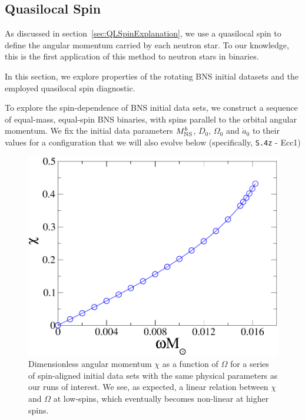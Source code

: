 \subsection{Quasilocal Spin}
\label{sec:QLSpinProperties}

As discussed in section~\ref{sec:QLSpinExplanation}, we use a
quasilocal spin to define the angular momentum carried by each
neutron star. To our knowledge, this is the first application of this
method to neutron stars in binaries. 

In this section, we explore properties of the rotating BNS initial
datasets and the employed quasilocal spin diagnostic.


To explore the spin-dependence of BNS initial data sets, we
construct a sequence of equal-mass, equal-spin BNS binaries, with
spins parallel to the orbital angular momentum. We fix the initial
data parameters $M^b_{\rm NS}$, $D_0$, $\Omega_0$ and $\dot{a}_0$ to
their values for a configuration that we will also evolve below (specifically,  {\tt S.4z} - Ecc1)


\begin{figure}
\includegraphics[width=0.95\columnwidth]{chap2/ChiVOmega}
\caption[Dimensionless angular momentum as a function of $\Omega$.]{{\label{fig:ChiVOmega}}Dimensionless angular momentum $\chi$ as a function of $\Omega$ for
  a series of spin-aligned initial data sets with the same physical
  parameters as our runs of interest. We see, as expected, a linear
  relation between $\chi$ and $\Omega$ at low-spins, which eventually
  becomes non-linear at higher spins. }
\end{figure}


